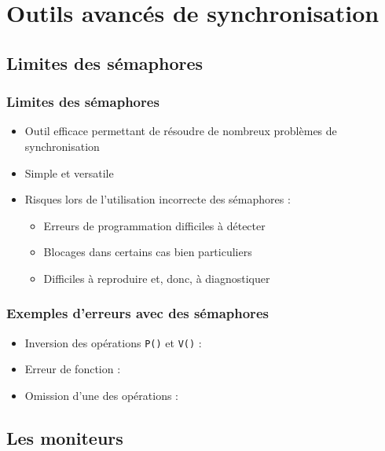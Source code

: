 \section{Outils avancés de synchronisation}

\subsection{Limites des sémaphores}
\begin{frame}
\frametitle{Limites des sémaphores}
\begin{itemize}
\item <1-> Outil efficace permettant de résoudre de nombreux problèmes de synchronisation
\item <1-> Simple et versatile
\item <2-> Risques lors de l’utilisation incorrecte des sémaphores :
\begin{itemize}
\item Erreurs de programmation difficiles à détecter
\item Blocages dans certains cas bien particuliers
\item Difficiles à reproduire et, donc, à diagnostiquer
\end{itemize}
\end{itemize}
\end{frame}

\begin{frame}
\frametitle{Exemples d’erreurs avec des sémaphores}
\begin{itemize}
\item <1-> Inversion des opérations \texttt{P()} et \texttt{V()} :\\
\begin{scriptsize}

\end{scriptsize}
\item <2-> Erreur de fonction :\\
\begin{scriptsize}

\end{scriptsize}
\item <3-> Omission d’une des opérations :\\
\begin{scriptsize}

\end{scriptsize}
\end{itemize}
\end{frame}
\subsection{Les moniteurs}

